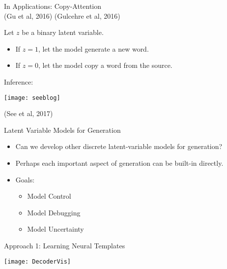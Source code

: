 \begin{frame}{ In Applications: Copy-Attention \\
      \small{(Gu et al, 2016) (Gulcehre et al, 2016)}}

Let $z$ be a binary latent variable.
\air
\begin{itemize}
\item If $z = 1$, let the model generate a new word.
\item If $z = 0$, let the model copy a word from the source.
\end{itemize}

Inference:
\begin{center}


\texttt{[image: seeblog]}

\centerline{\small (See et al, 2017)}
\end{center}
\end{frame}


\begin{frame}{ Latent Variable Models for Generation}

  \begin{itemize}
  \item Can we develop other discrete latent-variable models for generation?
    \air
  \item Perhaps each important aspect of generation can be built-in directly.
    \air
  \item Goals:
    \begin{itemize}
    \item Model Control
    \item Model Debugging
    \item Model Uncertainty
    \end{itemize}
  \end{itemize}
\end{frame}



\begin{frame}{Approach 1: Learning Neural Templates}

  \begin{center}
    \texttt{[image: DecoderVis]}
  \end{center}
\end{frame}

